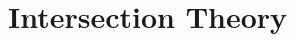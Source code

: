 \documentclass[../geometry_main.tex]{subfiles}
\begin{document}
\chapter{Intersection Theory}
\end{document}
